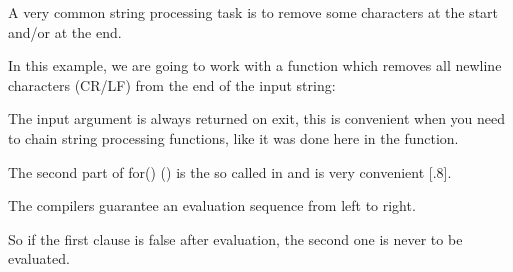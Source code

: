 \newcommand{\CRLF}{\ac{CR}/\ac{LF}}

A very common string processing task is to remove some characters at the start and/or at the end.

In this example, we are going to work with a function which removes all newline characters 
(\CRLF{}) from the end of the input string:



The input argument is always returned on exit, this is convenient when you need to chain 
string processing functions, like it was done here in the \main function.

The second part of for() () is the so called  
in \CCpp and is very convenient [.8].

The \CCpp compilers guarantee an evaluation sequence from left to right.

So if the first clause is false after evaluation, the second one is never to be evaluated.






